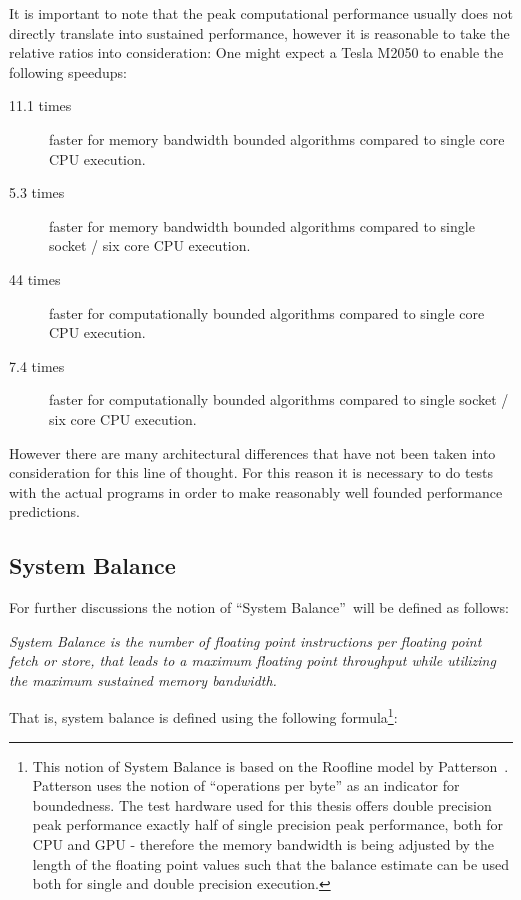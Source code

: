 It is important to note that the peak computational performance usually does not directly translate into sustained performance, however it is reasonable to take the relative ratios into consideration: One might expect a Tesla M2050 to enable the following speedups:
\begin{description}
 \item[11.1 times] faster for memory bandwidth bounded algorithms compared to single core CPU execution.
 \item[5.3 times] faster for memory bandwidth bounded algorithms compared to single socket / six core CPU execution.
 \item[44 times] faster for computationally bounded algorithms compared to single core CPU execution.
 \item[7.4 times] faster for computationally bounded algorithms compared to single socket / six core CPU execution.
\end{description}

However there are many architectural differences that have not been taken into consideration for this line of thought. For this reason it is necessary to do tests with the actual programs in order to make reasonably well founded performance predictions. 

\subsection{System Balance} \label{sub:hardwareSystemBalance}

For further discussions the notion of \textquotedblleft System Balance\textquotedblright\ will be defined as follows: 

\textit{System Balance is the number of floating point instructions per floating point fetch or store, that leads to a maximum floating point throughput while utilizing the maximum sustained memory bandwidth.}

That is, system balance is defined using the following formula\footnote{This notion of System Balance is based on the Roofline model by Patterson~\cite{Roofline}. Patterson uses the notion of ``operations per byte'' as an indicator for boundedness. The test hardware used for this thesis offers double precision peak performance exactly half of single precision peak performance, both for CPU and GPU - therefore the memory bandwidth is being adjusted by the length of the floating point values such that the balance estimate can be used both for single and double precision execution.}:

